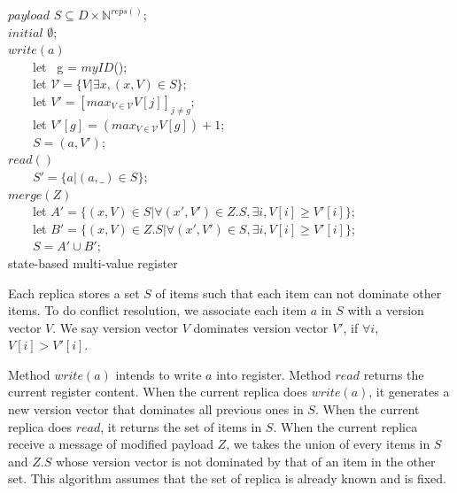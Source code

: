 \renewcommand{\algorithmcfname}{CRDT Implementation}
\noindent
\noindent\begin{algorithm}[H]
$\mathit{payload}$ $S \subseteq D \times \mathbb{N}^{\mathit{reps}()}$; \\
$\mathit{initial}$ $\emptyset$; \\

$\mathit{write}(a)$ \\
\ \ \ \ let \ g = $\mathit{myID}$(); \\
\ \ \ \ let $\mathcal{V} = \{ V \vert \exists x, (x,V) \in S \}$; \\
\ \ \ \ let $V' = [ \mathit{max}_{V \in \mathcal{V}} V[j] ]_{j \neq g}$; \\
\ \ \ \ let $V'[g] = (\mathit{max}_{V \in \mathcal{V}} V[g]) + 1$; \\
\ \ \ \ $S = (a,V')$; \\

$\mathit{read}()$ \\
\ \ \ \ \KwRet $S' = \{ a \vert (a,\_) \in S \}$; \\

$\mathit{merge}(Z)$ \\
\ \ \ \ let $A' = \{ (x,V) \in S \vert \forall (x',V') \in Z.S, \exists i, V[i] \geq V'[i] \}$; \\
\ \ \ \ let $B' = \{ (x,V) \in Z.S \vert \forall (x',V') \in S, \exists i, V[i] \geq V'[i] \}$; \\
\ \ \ \ $S = A' \cup B'$; \\
\caption{state-based multi-value register}
\label{Method1}
\end{algorithm}

Each replica stores a set $S$ of items such that each item can not dominate other items. To do conflict resolution, we associate each item $a$ in $S$ with a version vector $V$. We say version vector $V$ dominates version vector $V'$, if $\forall i$, $V[i] > V'[i]$.

Method $\mathit{write}(a)$ intends to write $a$ into register. Method $\mathit{read}$ returns the current register content. When the current replica does $\mathit{write}(a)$, it generates a new version vector that dominates all previous ones in $S$. When the current replica does $\mathit{read}$, it returns the set of items in $S$. When the current replica receive a message of modified payload $Z$, we takes the union of every items in $S$ and $Z.S$ whose version vector is not dominated by that of an item in the other set. This algorithm assumes that the set of replica is already known and is fixed.


